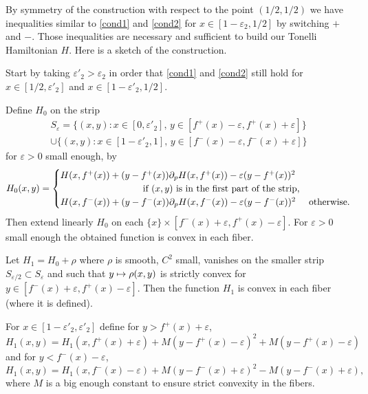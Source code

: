 \documentclass[10pt]{amsart}
\newcommand\mto{\mathchoice{\longmapsto}{\mapsto}{\mapsto}{\mapsto}}
\theoremstyle{definition}
\begin{document}
\begin{appendix}
By symmetry of the construction with respect to the point $(1/2,1/2)$ we have inequalities similar to \eqref {cond1} and \eqref{cond2} for $x\in [1-\varepsilon_2,1/2]$ by switching $+$ and $-$. Those inequalities are necessary and sufficient to build our Tonelli Hamiltonian $H$. Here is a sketch of the construction.

Start by taking $\varepsilon'_2>\varepsilon_2$ in order that \eqref {cond1} and \eqref{cond2} still hold for $x\in [1/2,\varepsilon'_2]$ and $x\in [1-\varepsilon'_2,1/2]$.

Define $H_0$ on the strip\vspace*{-5pt}
\begin{multline*}
S_\varepsilon = \bigl\{(x,y): x\in [0,\varepsilon'_2],\, y\in [f^+(x)-\varepsilon, f^+(x)+\varepsilon]\bigr\}\\
\cup \bigl\{(x,y): x\in [1-\varepsilon'_2,1],\, y\in [f^-(x)-\varepsilon, f^-(x)+\varepsilon]\bigr\}
\end{multline*}
for $\varepsilon>0$
small enough, by\vspace*{-2pt}
\[
H_0(x,y) =
\begin{cases}
H(x,f^+(x)) + (y-f^+(x)) \partial_pH(x,f^+(x))-\varepsilon(y-f^+(x))^2\\
\hspace*{3cm}\text{ if $(x,y)$ is in the first part of the strip},\\
H(x,f^-(x)) + (y-f^-(x)) \partial_pH(x,f^-(x))- \varepsilon(y-f^-(x))^2& \text{otherwise.}
\end{cases}
\]
Then extend linearly $H_0$ on each $\{x\}\times [f^-(x)+\varepsilon, f^+(x)-\varepsilon]$. For $\varepsilon>0$ small enough the obtained function is convex in each fiber.

Let $H_1 = H_0+\rho$ where $\rho $ is smooth, $C^2$ small, vanishes on the smaller strip $S_{\varepsilon/2} \subset S_\varepsilon$ and such that $y\mto \rho(x,y)$ is strictly convex for $y\in [f^-(x)+\varepsilon, f^+(x)-\varepsilon]$. Then the function $H_1$ is convex in each fiber (where it is defined).

For $x\in [1-\varepsilon'_2, \varepsilon'_2]$ define for $y>f^+(x)+\varepsilon$,
\[
H_1(x,y) = H_1(x,f^+(x)+\varepsilon) + M(y-f^+(x)-\varepsilon)^2+ M(y-f^+(x)-\varepsilon)
\]
and for
$y<f^-(x)-\varepsilon$,
\[
H_1(x,y) = H_1(x,f^-(x)-\varepsilon) + M(y-f^-(x)+\varepsilon)^2- M(y-f^-(x)+\varepsilon),
\]
where $M$ is a big enough constant to ensure strict convexity in the fibers.


\end{appendix}
\end{document}
